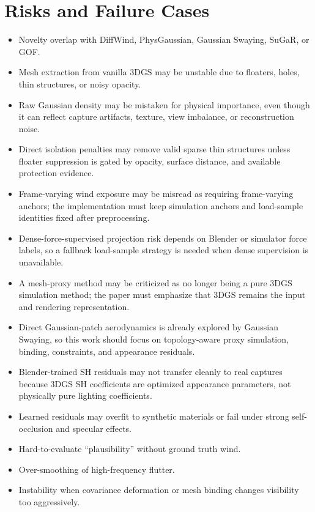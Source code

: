\documentclass[11pt]{article}
\begin{document}
\section{Risks and Failure Cases}

\begin{itemize}
  \item Novelty overlap with DiffWind, PhysGaussian, Gaussian Swaying, SuGaR, or GOF.
  \item Mesh extraction from vanilla 3DGS may be unstable due to floaters, holes, thin structures, or noisy opacity.
  \item Raw Gaussian density may be mistaken for physical importance, even though it can reflect capture artifacts, texture, view imbalance, or reconstruction noise.
  \item Direct isolation penalties may remove valid sparse thin structures unless floater suppression is gated by opacity, surface distance, and available protection evidence.
  \item Frame-varying wind exposure may be misread as requiring frame-varying anchors; the implementation must keep simulation anchors and load-sample identities fixed after preprocessing.
  \item Dense-force-supervised projection risk depends on Blender or simulator force labels, so a fallback load-sample strategy is needed when dense supervision is unavailable.
  \item A mesh-proxy method may be criticized as no longer being a pure 3DGS simulation method; the paper must emphasize that 3DGS remains the input and rendering representation.
  \item Direct Gaussian-patch aerodynamics is already explored by Gaussian Swaying, so this work should focus on topology-aware proxy simulation, binding, constraints, and appearance residuals.
  \item Blender-trained SH residuals may not transfer cleanly to real captures because 3DGS SH coefficients are optimized appearance parameters, not physically pure lighting coefficients.
  \item Learned residuals may overfit to synthetic materials or fail under strong self-occlusion and specular effects.
  \item Hard-to-evaluate ``plausibility'' without ground truth wind.
  \item Over-smoothing of high-frequency flutter.
  \item Instability when covariance deformation or mesh binding changes visibility too aggressively.
\end{itemize}
\end{document}
